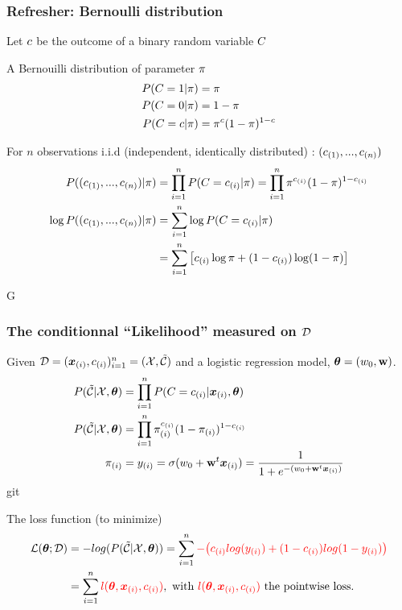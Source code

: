 


\begin{frame}
  \frametitle{Refresher:  Bernoulli distribution}
  Let ${c}$ be the outcome of a binary random variable ${C}$
  \begin{block}{A Bernouilli distribution of parameter $\pi$}
    \begin{align*}
      P({C}=1|\pi) &= \pi\\ 
      P({C}=0|\pi) &= 1-\pi \\
      P({C}={c}|\pi) &= \pi^{{c}} (1-\pi)^{1-{c}}
    \end{align*}
  \end{block}
  For  $n$ observations i.i.d  (independent, identically distributed) : $({c}_{(1)}, ... , {c}_{(n)} )$
  \begin{align*}
    P(({c}_{(1)}, ... , {c}_{(n)} )|\pi) &= \prod_{i=1}^n P({C}={c}_{(i)}|\pi) = \prod_{i=1}^n \pi^{{c}_{(i)}} (1-\pi)^{1-{c}_{(i)}}\\
    \log P(({c}_{(1)}, ... , {c}_{(n)} )|\pi) &= \sum_{i=1}^n \log P({C}={c}_{(i)}|\pi) \\
    &= \sum_{i=1}^n \big[ {{c}_{(i)}}\log\pi + (1-{c}_{(i)})\log (1-\pi) \big]
  \end{align*}
  \end{frame}

G
  
\begin{frame}
  \frametitle{The conditionnal ``Likelihood'' measured on $\mathcal{D}$}
     Given $\mathcal{D} = (\boldsymbol{x}_{(i)},{c}_{(i)})_{i=1}^n = (\mathcal{X},\tilde{\mathcal{C}})$ and a logistic regression model, $\boldsymbol{\theta} =  (w_0, \mathbf{w})$. 
     \begin{align*}
       P(\tilde{\mathcal{C}} | \mathcal{X}, \boldsymbol{\theta}) &= \prod_{i=1}^n P({C} = {c}_{(i)}| \boldsymbol{x}_{(i)}, \boldsymbol{\theta}) \\
       P(\tilde{\mathcal{C}} | \mathcal{X}, \boldsymbol{\theta}) &= \prod_{i=1}^n\pi_{(i)}^{{c}_{(i)}} (1-\pi_{(i)})^{1-{c}_{(i)}}\\
       \pi_{(i)} &= y_{(i)} = \sigma(w_0 + \mathbf{w}^t\boldsymbol{x}_{(i)})  = \frac{1}{1+e^{-(w_0 + \mathbf{w}^t\boldsymbol{x}_{(i)})}}
     \end{align*}git 
     \begin{block}{The loss function (to minimize)}
       \begin{align*}
         \mathcal{L}(\boldsymbol{\theta};\mathcal{D}) &= - log(P(\tilde{\mathcal{C}} | \mathcal{X}, \boldsymbol{\theta}) ) =  \sum_{i=1}^n  {\color{red} - \big(  {c}_{(i)} log(y_{(i)} )+ (1-{c}_{(i)}) log(1-y_{(i)})  \big)}\\
                   &= \sum_{i=1}^n  {\color{red} l(\boldsymbol{\theta},\boldsymbol{x}_{(i)},{c}_{(i)}) }, \textrm{ with } {\color{red} \ensuremath{l}(\ensuremath{\boldsymbol{\theta}},\ensuremath{\boldsymbol{x}_{(i)}},\ensuremath{{c}_{(i)}})} \textrm{ the pointwise loss.}
       \end{align*}
     \end{block}
\end{frame}
